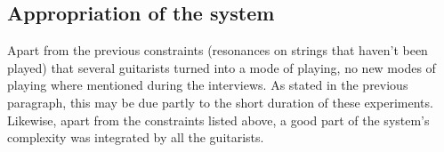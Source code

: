 \documentclass{article}
\begin{document}



\subsection{Appropriation of the system}

Apart from the previous constraints (resonances on strings that haven't been played) that several guitarists turned into a mode of playing, no new modes of playing where mentioned during the interviews. As stated in the previous paragraph, this may be due partly to the short duration of these experiments.  
Likewise, apart from the constraints listed above, a good part of the system's complexity was integrated by all the guitarists.
\end{document}

